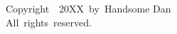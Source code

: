 \vspace*{3in}
\begin{singlespace}
	\begin{center}
		Copyright~\textcopyright{}~20XX~by~Handsome Dan\\
		All~rights~reserved.
	\end{center}
\end{singlespace}